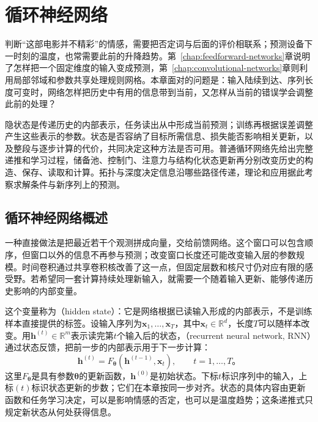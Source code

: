 \chapter{循环神经网络}
\label{chap:recurrent-networks}

判断“这部电影并不精彩”的情感，需要把否定词与后面的评价相联系；预测设备下一时刻的温度，也常需要此前的升降趋势。第~\ref{chap:feedforward-networks}章说明了怎样把一个固定维度的输入变成预测，第~\ref{chap:convolutional-networks}章则利用局部邻域和参数共享处理规则网格。本章面对的问题是：输入陆续到达、序列长度可变时，网络怎样把历史中有用的信息带到当前，又怎样从当前的错误学会调整此前的处理？

隐状态是传递历史的内部表示，任务读出从中形成当前预测；训练再根据误差调整产生这些表示的参数。状态是否容纳了目标所需信息、损失能否影响相关更新，以及整段与逐步计算的代价，共同决定这种方法是否可用。普通循环网络先给出完整递推和学习过程，储备池、控制门、注意力与结构化状态更新再分别改变历史的构造、保存、读取和计算。拓扑与深度决定信息沿哪些路径传递，理论和应用据此考察求解条件与新序列上的预测。

\section{循环神经网络概述}
\label{sec:rnn-overview}

一种直接做法是把最近若干个观测拼成向量，交给前馈网络。这个窗口可以包含顺序，但窗口以外的信息不再参与预测；改变窗口长度还可能改变输入层的参数规模。时间卷积通过共享卷积核改善了这一点，但固定层数和核尺寸仍对应有限的感受野。若希望同一套计算持续处理新输入，就需要一个随着输入更新、能够传递历史影响的内部变量。

这个变量称为（hidden state）：它是网络根据已读输入形成的内部表示，不是训练样本直接提供的标签。设输入序列为$\bm{x}_1,\ldots,\bm{x}_T$，其中$\bm{x}_t\in\mathbb{R}^{d}$，长度$T$可以随样本改变。用$\bm{h}^{(t)}\in\mathbb{R}^{m}$表示读完第$t$个输入后的状态，（recurrent neural network, RNN）通过状态反馈，把前一步的内部表示用于下一步计算：
\begin{equation}
  \bm{h}^{(t)}=F_{\bm{\theta}}\!\left(\bm{h}^{(t-1)},\bm{x}_t\right),
  \qquad t=1,\ldots,T\text{。}
  \label{eq:rnn-general-recurrence}
\end{equation}
这里$F_{\bm{\theta}}$是具有参数$\bm{\theta}$的更新函数，$\bm{h}^{(0)}$是初始状态。下标$t$标识序列中的输入，上标$(t)$标识状态更新的步数；它们在本章按同一步对齐。状态的具体内容由更新函数和任务学习决定，可以是影响情感的否定，也可以是温度趋势；这条递推式只规定新状态从何处获得信息。

